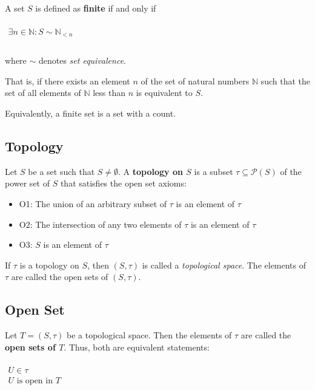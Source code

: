 A set $S$ is defined as \textbf{finite} if and only if

\begin{math}
  \begin{array}{c}
    \\
    \exists n \in \mathbb{N}: S \sim \mathbb{N}_{< n}\\
    \\
  \end{array}
\end{math}

where $\sim$ denotes \textit{set equivalence}.

That is, if there exists an element $n$ of the set of natural numbers
$\mathbb{N}$ such that the set of all elements of $\mathbb{N}$ less
than $n$ is equivalent to $S$.

Equivalently, a finite set is a set with a count.

\subsection{Topology}
\label{sec:topology}

Let $S$ be a set such that $S \neq \emptyset$. A \textbf{topology on
  $S$} is a subset $\tau \subseteq \mathcal{P}(S)$ of the power set of
$S$ that satisfies the open set axioms:
\begin{itemize}
\item O1: The union of an arbitrary subset of $\tau$ is an element of
$\tau$
\item O2: The intersection of any two elements of $\tau$ is an element
of $\tau$
\item O3: $S$ is an element of $\tau$
\end{itemize}

If $\tau$ is a topology on $S$, then $(S, \tau)$ is called a
\textit{topological space}. The elements of $\tau$ are called the open
sets of $(S, \tau)$.

\subsection{Open Set}
\label{sec:open-set}

Let $T = (S, \tau)$ be a topological space. Then the elements of
$\tau$ are called the \textbf{open sets of $T$}. Thus, both are
equivalent statements:

\begin{math}
  \begin{array}{l}
    \\
    U \in \tau \\
    U \text{ is open in } T\\
    \\
  \end{array}
\end{math}


